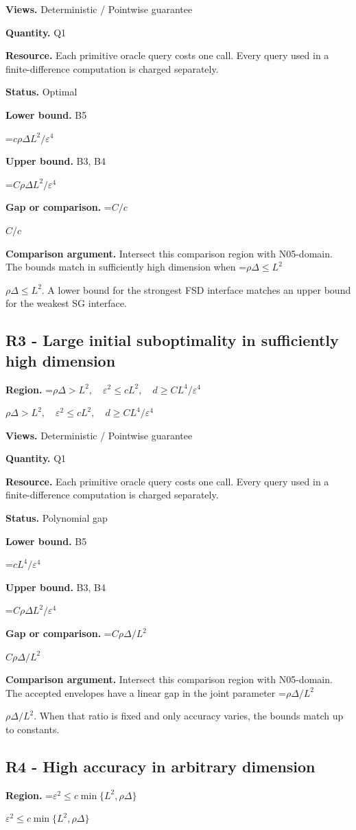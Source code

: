 \documentclass[10pt,a4paper]{article}
\newcommand{\AtlasMath}[1]{\par\begingroup\centering\setbox0=\hbox{$\displaystyle #1$}\ifdim\wd0>1.4\linewidth\typeout{ATLAS WIDE FORMULA: \the\wd0}\fi\ifdim\wd0>\linewidth\resizebox{\linewidth}{!}{\box0}\else\box0\fi\par\endgroup}
\newcommand{\AtlasInlineMath}[1]{\begingroup\setbox0=\hbox{$#1$}\ifdim\wd0>.4\linewidth\endgroup\AtlasMath{#1}\else\endgroup$#1$\fi}
\begin{document}
\textbf{Views.} Deterministic / Pointwise guarantee

\textbf{Quantity.} Q1

\textbf{Resource.} Each primitive oracle query costs one call. Every query used in a finite-difference computation is charged separately.

\textbf{Status.} Optimal

\textbf{Lower bound.} B5

\AtlasMath{c\rho\Delta L^2/\varepsilon^4}
\textbf{Upper bound.} B3, B4

\AtlasMath{C\rho\Delta L^2/\varepsilon^4}
\textbf{Gap or comparison.} \AtlasInlineMath{C/c}

\textbf{Comparison argument.} Intersect this comparison region with N05-domain. The bounds match in sufficiently high dimension when \AtlasInlineMath{\rho\Delta\le L^2}. A lower bound for the strongest FSD interface matches an upper bound for the weakest SG interface.

\subsection{R3 - Large initial suboptimality in sufficiently high dimension}
\textbf{Region.} \AtlasInlineMath{\rho\Delta>L^2,\quad\varepsilon^2\le cL^2,\quad d\ge CL^4/\varepsilon^4}

\textbf{Views.} Deterministic / Pointwise guarantee

\textbf{Quantity.} Q1

\textbf{Resource.} Each primitive oracle query costs one call. Every query used in a finite-difference computation is charged separately.

\textbf{Status.} Polynomial gap

\textbf{Lower bound.} B5

\AtlasMath{cL^4/\varepsilon^4}
\textbf{Upper bound.} B3, B4

\AtlasMath{C\rho\Delta L^2/\varepsilon^4}
\textbf{Gap or comparison.} \AtlasInlineMath{C\rho\Delta/L^2}

\textbf{Comparison argument.} Intersect this comparison region with N05-domain. The accepted envelopes have a linear gap in the joint parameter \AtlasInlineMath{\rho\Delta/L^2}. When that ratio is fixed and only accuracy varies, the bounds match up to constants.

\subsection{R4 - High accuracy in arbitrary dimension}
\textbf{Region.} \AtlasInlineMath{\varepsilon^2\le c\min\{L^2,\rho\Delta\}}
\end{document}
